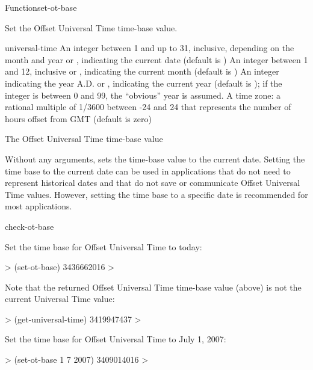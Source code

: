 \documentclass[10pt,twoside,english,pdftex]{article}
\begin{document}
\begin{functiondoc}{Function}{set-ot-base}{ 
    }
%

\fnsyntax

\fnpurpose Set the Offset Universal Time time-base value.

\fnpackage {}

\fnmodule {}

\fnargs
\begin{args}{universal-time}
  \arg[date] An integer between 1 and up to 31, inclusive, depending
  on the month and year or \nil, indicating the current date (default is \nil)
  \arg[month] An integer between 1 and 12, inclusive or \nil, indicating the
  current month (default is \nil)
  \arg[year] An integer indicating the year A.D. or \nil, indicating the
  current year (default is \nil); if the 
  integer is between 0 and 99, the ``obvious'' year is assumed.
   A time zone: a rational multiple of 1/3600 between
  -24 and 24 that represents the number of hours offset from GMT 
  (default is zero)
\end{args}

\fnreturns The Offset Universal Time time-base value

\fndescription Without any arguments,  sets the
time-base value to the current date.  Setting the time base to the current
date can be used in applications that do not need to represent historical
dates and that do not save or communicate Offset Universal Time values.
However, setting the time base to a specific date is recommended for most
applications.

\begin{alsos}{check-ot-base}
\also[*ot-base*]
\also[ot2ut]
\also[ut2ot]
\end{alsos}

\fnexamples
Set the time base for Offset Universal Time to today:
%
\W\supp
\begin{example}
  > (set-ot-base)
  3436662016
  >
\end{example}
Note that the returned Offset Universal Time time-base value (above) is not
the current Universal Time value:
%
\W\supp\notpretop
\begin{example}
  > (get-universal-time)
  3419947437
  >
\end{example}

Set the time base for Offset Universal Time to July 1, 2007:
%
\W\supp
\begin{example}
  > (set-ot-base 1 7 2007)
  3409014016
  >
\end{example}

\end{functiondoc}
\end{document}
